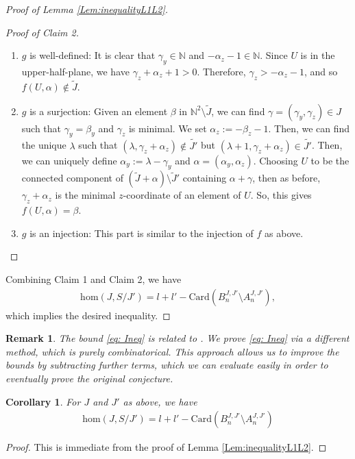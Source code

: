 \documentclass[10pt,a4paper]{amsart}
\newcommand{\BN}{{\mathbb{N}}}
\newtheorem{corollary}{Corollary}
\newtheorem{remark}{Remark}
\begin{document}
\begin{proof}[Proof of Lemma \ref{Lem:inequalityL1L2}]
\begin{proof}[Proof of Claim 2]
\begin{enumerate}
    \item $g$ is well-defined: It is clear that $\gamma_y \in \BN$ and $-\alpha_z-1\in\BN$. Since $U$ is in the upper-half-plane, we have $\gamma_z+\alpha_z+1> 0$. Therefore, $\gamma_z>-\alpha_z-1$, and so $f(U,\alpha)\notin\tilde{J}$.
    \item $g$ is a surjection: Given an element $\beta$ in $\mathbb{N}^2\setminus\tilde{J}$, we can find $\gamma=(\gamma_y,\gamma_z)\in J$ such that $\gamma_y=\beta_y$ and $\gamma_z$ is minimal. We set $\alpha_z:=-\beta_z-1$. Then, we can find the unique $\lambda$ such that $(\lambda,\gamma_z+\alpha_z)\notin\tilde{J'}$ but $(\lambda+1,\gamma_z+\alpha_z)\in\tilde{J'}$. Then, we can uniquely define $\alpha_y:=\lambda-\gamma_y$ and $\alpha=(\alpha_y,\alpha_z)$. Choosing $U$ to be the connected component of $(\tilde{J}+\alpha)\setminus\tilde{J}'$ containing $\alpha+\gamma$, then as before, $\gamma_z+\alpha_z$ is the minimal $z$-coordinate of an element of $U$. So, this gives $f(U,\alpha)=\beta$.
    \item $g$ is an injection: This part is similar to the injection of $f$ as above.
\end{enumerate}
    
\end{proof}


Combining Claim 1 and Claim 2, we have
\begin{align*}
    \mathrm{hom}(J,S/J')= l+l'-\mathrm{Card}( B^{J,J'}_n\setminus A^{J,J'}_n),
    \end{align*}
which implies the desired inequality.
\end{proof}

\begin{remark}
    The bound \eqref{eq: Ineq} is related to  \cite[Proposition 4.1]{Ramkumar-Sammartano}. We prove \eqref{eq: Ineq}  via a different method, which is purely combinatorical. This approach allows us to improve the bounds by subtracting further terms, which we can evaluate easily in order to eventually prove the original conjecture.
\end{remark}






\begin{corollary} \label{Cor:An'An}
    For $J$ and $J'$ as above, we have
    \begin{align}
        \mathrm{hom}(J,S/J')=l+l'-\mathrm{Card}( B^{J,J'}_n\setminus A^{J,J'}_n)
    \end{align}
\end{corollary}
\begin{proof}
    This is immediate from the proof of Lemma \ref{Lem:inequalityL1L2}.
\end{proof}
\end{document}
